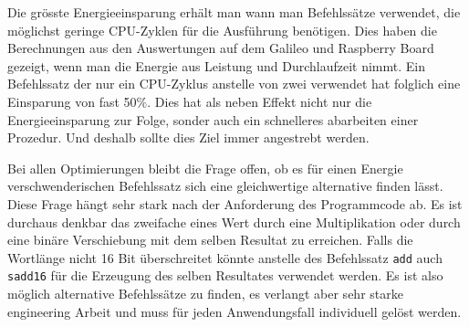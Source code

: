 \par
Die grösste Energieeinsparung erhält man wann man Befehlssätze verwendet, die möglichst geringe CPU-Zyklen für die Ausführung benötigen. Dies haben die Berechnungen aus den Auswertungen auf dem Galileo und Raspberry Board gezeigt, wenn man die Energie aus Leistung und Durchlaufzeit nimmt. Ein Befehlssatz der nur ein CPU-Zyklus anstelle von zwei verwendet hat folglich eine Einsparung von fast 50\%. Dies hat als neben Effekt nicht nur die Energieeinsparung zur Folge, sonder auch ein schnelleres abarbeiten einer Prozedur. Und deshalb sollte dies Ziel immer angestrebt werden.
\par
Bei allen Optimierungen bleibt die Frage offen, ob es für einen Energie verschwenderischen Befehlssatz sich eine gleichwertige alternative finden lässt. Diese Frage hängt sehr stark nach der Anforderung des Programmcode ab. Es ist durchaus denkbar das zweifache eines Wert durch eine Multiplikation oder durch eine binäre Verschiebung mit dem selben Resultat zu erreichen. Falls die Wortlänge nicht 16 Bit überschreitet könnte anstelle des Befehlssatz \texttt{add} auch \texttt{sadd16} für die Erzeugung des selben Resultates verwendet werden. Es ist also möglich alternative Befehlssätze zu finden, es verlangt aber sehr starke engineering Arbeit und muss für jeden Anwendungsfall individuell gelöst werden.




















